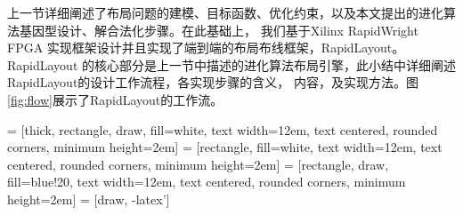 上一节详细阐述了布局问题的建模、目标函数、优化约束，以及本文提出的进化算法基因型设计、解合法化步骤。在此基础上，
我们基于Xilinx RapidWright FPGA 实现框架设计并且实现了端到端的布局布线框架，RapidLayout。RapidLayout
的核心部分是上一节中描述的进化算法布局引擎，此小结中详细阐述RapidLayout的设计工作流程，各实现步骤的含义，
内容，及实现方法。图\ref{fig:flow}展示了RapidLayout的工作流。



 = [thick, rectangle, draw, fill=white, text width=12em, text centered, rounded corners, minimum height=2em]
 = [rectangle, fill=white, text width=12em, text centered, rounded corners, minimum height=2em]
 = [rectangle, draw, fill=blue!20, text width=12em, text centered, rounded corners, minimum height=2em]
 = [draw, -latex']




